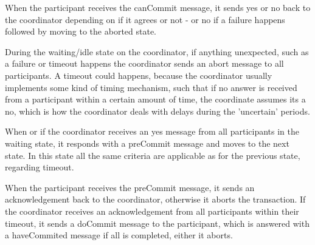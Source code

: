 \documentclass[10pt,a4paper]{article}
\begin{document}
When the participant receives the canCommit message, it sends yes or no back to the coordinator depending on if it agrees or not - or no if a failure happens followed by moving to the aborted state. 
\newline

During the waiting/idle state on the coordinator, if anything unexpected, such as a failure or timeout happens the coordinator sends an abort message to all participants. A timeout could happens, because the coordinator usually implements some kind of timing mechanism, such that if no answer is received from a participant within a certain amount of time, the coordinate assumes its a no, which is how the coordinator deals with delays during the 'uncertain' periods.
\newline

When or if the coordinator receives an yes message from all participants in the waiting state, it responds with a preCommit message and moves to the next state. In this state all the same criteria are applicable as for the previous state, regarding timeout.
\newline

When the participant receives the preCommit message, it sends an acknowledgement back to the coordinator, otherwise it aborts the transaction. If the coordinator receives an acknowledgement from all participants within their timeout, it sends a doCommit message to the participant, which is answered with a haveCommited message if all is completed, either it aborts.
\end{document}
